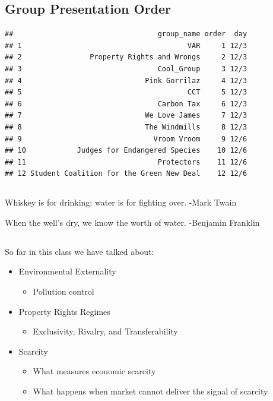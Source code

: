 \documentclass[]{article}
\title{}
\author{}
\date{}
\providecommand{\tightlist}{%
  \setlength{\itemsep}{0pt}\setlength{\parskip}{0pt}}
\begin{document}
\hypertarget{group-presentation-order}{%
\subsection{Group Presentation Order}\label{group-presentation-order}}

\begin{verbatim}
##                                  group_name order  day
## 1                                       VAR     1 12/3
## 2                Property Rights and Wrongs     2 12/3
## 3                                Cool_Group     3 12/3
## 4                             Pink Gorrilaz     4 12/3
## 5                                       CCT     5 12/3
## 6                                Carbon Tax     6 12/3
## 7                             We Love James     7 12/3
## 8                             The Windmills     8 12/3
## 9                               Vroom Vroom     9 12/6
## 10            Judges for Endangered Species    10 12/6
## 11                               Protectors    11 12/6
## 12 Student Coalition for the Green New Deal    12 12/6
\end{verbatim}

\hypertarget{section}{%
\subsection{}\label{section}}

Whiskey is for drinking; water is for fighting over. -Mark Twain

When the well's dry, we know the worth of water. -Benjamin Franklin

\hypertarget{section-1}{%
\subsection{}\label{section-1}}

So far in this class we have talked about:

\begin{itemize}
\tightlist
\item
  Environmental Externality

  \begin{itemize}
  \tightlist
  \item
    Pollution control
  \end{itemize}
\item
  Property Rights Regimes

  \begin{itemize}
  \tightlist
  \item
    Exclusivity, Rivalry, and Transferability
  \end{itemize}
\item
  Scarcity

  \begin{itemize}
  \tightlist
  \item
    What measures economic scarcity
  \item
    What happens when market cannot deliver the signal of scarcity
  \end{itemize}
\end{itemize}
\end{document}
